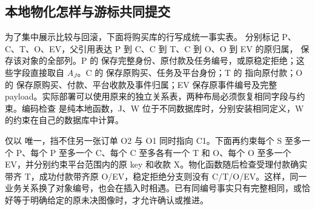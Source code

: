 \subsection*{本地物化怎样与游标共同提交}

为了集中展示比较与回滚，下面将购买库的行写成统一事实表。 分别标记 P、C、T、O、EV，父引用表达 P 到 C、C 到 T、C 到 O、O 到 EV 的原归属， 保存该对象的全部列。P 的  保存完整身份、原付款及任务编号，或原稳定拒绝；这些字段直接取自 $A_J$。C 的  保存原购买、任务及平台身份；T 的  指向原付款；O 的  保存原购买、付款、平台收款及事件归属；EV 保存原事件编号及完整 payload。实际部署可以使用原来的独立关系表，两种布局必须恢复相同字段与约束。编码检查  是纯本地函数，J、W 位于不同数据库时，分别安装相同定义，W 的约束在自己的数据库中计算。

仅以  唯一，挡不住另一张订单 O2 与 O1 同时指向 C1。下面再约束每个 S 至多一个 P、每个 P 至多一个 C、每个 C 至多各有一个 T 和 O、每个 O 至多一个 EV，并分别约束平台范围内的原 key 和收款 X。物化函数随后检查受理付款确实带齐 T，成功付款带齐原 O/EV，稳定拒绝分支则没有 C/T/O/EV。这样，同一业务关系换了对象编号，也会在插入时相遇。已有同编号事实只有完整相同，或恰好等于明确给定的原未决图像时，才允许确认或推进。

